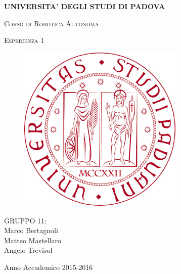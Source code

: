 \documentclass[english]{article}
\begin{document}
\begin{titlepage} 

\begin{center}
\begin{Large} \textbf{UNIVERSITA' DEGLI STUDI DI PADOVA} \\
 \end{Large} \vspace{1cm}

\begin{Large} \textsc{Corso di Robotica Autonoma }\end{Large}
\par\end{center}

\begin{center}
\begin{Large}\textsc{Esperienza 1}\\
 \end{Large}
\par\end{center}

\begin{center}
\vspace{2cm}
\begin{figure}[!htb]
\centering \includegraphics[width=8cm]{unipd}\\
 
\end{figure}

\par\end{center}

\begin{center}
\vspace{2cm}
 \begin{Large}
 GRUPPO 11: \\
 Marco Bertagnoli \\ 
 Matteo Mastellaro \\ 
 Angelo Trevisol\\
 \end{Large} \vspace{2cm}
 \begin{Large} Anno Accademico 2015-2016 \end{Large} 
\par\end{center}

\end{titlepage}
\end{document}
